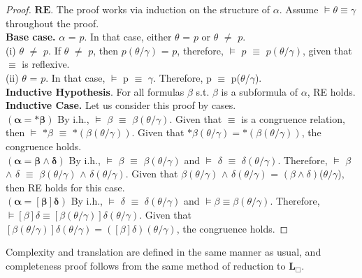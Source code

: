 \documentclass[paper=a4, fontsize=11pt]{scrartcl} %
\numberwithin{equation}{section} %
\numberwithin{figure}{section} %
\numberwithin{table}{section} %
\begin{document}
\begin{proof}
$\bm{RE}$. The proof works via induction on the structure of $\alpha$. Assume $\vDash \theta \equiv \gamma$ throughout the proof.\\
    \noindent\textbf{Base case.} $\alpha$ = $p$. In that case, either $\theta$ = $p$ or $\theta$ $\neq$ $p$. \\
    (i) $\theta$ $\neq$ $p$. If $\theta$ $\neq$ $p$, then $p$$(\theta/\gamma)$ = $p$, therefore, $\vDash$ $p$ $\equiv$ $p$$(\theta/\gamma)$, given that $\equiv$ is reflexive.\\
    (ii) $\theta$ = $p$. In that case, $\vDash$ p $\equiv$ $\gamma$. Therefore, p $\equiv$ p($\theta$/$\gamma$).
    \\\noindent\textbf{Inductive Hypothesis}. For all formulas $\beta$ s.t. $\beta$ is a subformula of $\alpha$, RE holds. 
\\\noindent\textbf{Inductive Case.} Let us consider this proof by cases. 
\\ $\bm{(\alpha = *\beta)}$ By i.h., $\vDash$ $\beta$ $\equiv$ $\beta(\theta/\gamma)$. Given that $\equiv$ is a congruence relation, then $\vDash$ $*\beta$ $\equiv$ $*(\beta(\theta/\gamma))$. Given that $*\beta(\theta/\gamma) = *(\beta(\theta/\gamma))$, the congruence holds.
\\$\bm{(\alpha=\beta \land \delta)}$ By i.h., $\vDash$ $\beta$ $\equiv$ $\beta(\theta/\gamma)$ and $\vDash$ $\delta$ $\equiv$ $\delta(\theta/\gamma)$. Therefore, $\vDash$ $\beta$ $\land$ $\delta$ $\equiv$ $\beta(\theta/\gamma)$ $\land$ $\delta(\theta/\gamma)$. Given that $\beta(\theta/\gamma)$ $\land$ $\delta(\theta/\gamma)$ = $(\beta \land \delta)$($\theta/\gamma$), then RE holds for this case.
\\$\bm{(\alpha = [\beta]\delta)}$ By i.h., $\vDash$ $\delta$ $\equiv$ $\delta(\theta /
\gamma)$ and $\vDash \beta \equiv \beta(\theta/\gamma)$. Therefore, $\vDash [\beta]\delta \equiv [\beta(\theta/\gamma)]\delta(\theta/\gamma)$. Given that $[\beta(\theta/\gamma)]\delta(\theta/\gamma) = ([\beta]\delta)(\theta/\gamma)$, the congruence holds.
        
\end{proof}


Complexity and translation are defined in the same manner as usual, and completeness proof follows from the same method of reduction to \textbf{L}$_\Box$. 
\end{document}

